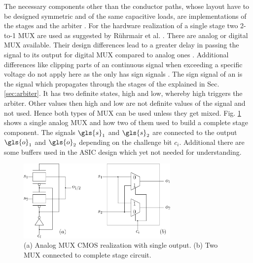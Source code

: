The necessary components other than the conductor paths, whose layout have to be designed symmetric and of the same capacitive loads, are implementations of the stages and the arbiter \cite{Maes2012ExperimentalCMOS}.
For the hardware realization of a single stage two 2-to-1 \ac{MUX} are used as suggested by Rührmair et al. \cite{Ruhrmair2013PUFData, Lee2004AApplications}.
There are analog or digital \ac{MUX} available.
Their design differences lead to a greater delay in passing the signal to its output for digital \ac{MUX} compared to analog ones \cite{2016MultiplexerWikipedia}.
Additional differences like clipping parts of an continuous signal when exceeding a specific voltage do not apply here as the \apuf
only has sign signals \cite{Semiconductor2002BasicComparison}.
The sign signal of an \apuf is the signal which propagates through the stages of the \apuf explained in Sec. \ref{sec:arbiter}.
It has two definite states, high and low, whereby high triggers the arbiter.
Other values then high and low are not definite values of the signal and not used.
Hence both types of \ac{MUX} can be used unless they get mixed.
Fig. \ref{fig:multiplexer} shows a single analog \ac{MUX} and how two of them used to build a complete stage component.
The signals $\gls{s}_1$ and $\gls{s}_2$ are connected to the output $\gls{o}_1$ and $\gls{o}_2$ depending on the challenge bit $c_i$.
Additional there are some buffers used in the \ac{ASIC} design which yet not needed for understanding.

\begin{figure}[ht]
\centering
\includegraphics[width=0.70\textwidth]{images/stage_circuit.eps}
\caption{(a) Analog \ac{MUX} \ac{CMOS} realization with single output.
(b) Two \acs{MUX} connected to complete stage circuit.}
\label{fig:multiplexer}
\end{figure}

